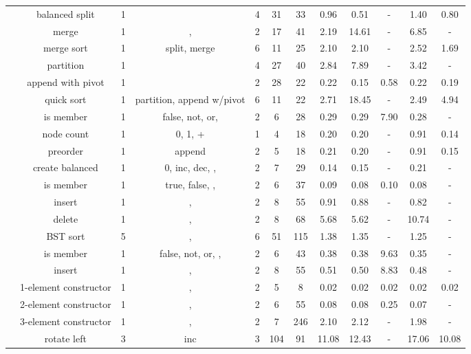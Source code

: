 \documentclass[10pt,preprint]{sigplanconf-pldi16}
\theoremstyle{definition}
\begin{document}
\begin{table*}[!htbp]
\begin{center}
{\begin{tabular}{@{} r|c| cccc | cccccc @{}}
 & balanced split & 1 &  & 4 & 31 & 33 & 0.96 & 0.51 & - & 1.40 & 0.80 \\
 & merge & 1 & ,  & 2 & 17 & 41 & 2.19 & 14.61 & - & 6.85 & - \\
 & merge sort & 1 & split, merge & 6 & 11 & 25 & 2.10 & 2.10 & - & 2.52 & 1.69 \\
 & partition & 1 &  & 4 & 27 & 40 & 2.84 & 7.89 & - & 3.42 & - \\
 & append with pivot & 1 &  & 2 & 28 & 22 & 0.22 & 0.15 & 0.58 & 0.22 & 0.19 \\
 & quick sort & 1 & partition, append w/pivot & 6 & 11 & 22 & 2.71 & 18.45 & - & 2.49 & 4.94 \\
\hline\multirow{4}{*}{\parbox{1cm}{\vspace{-0.85\baselineskip}}} & is member & 1 & false, not, or,  & 2 & 6 & 28 & 0.29 & 0.29 & 7.90 & 0.28 & - \\
 & node count & 1 & 0, 1, + & 1 & 4 & 18 & 0.20 & 0.20 & - & 0.91 & 0.14 \\
 & preorder & 1 & append & 2 & 5 & 18 & 0.21 & 0.20 & - & 0.91 & 0.15 \\
 & create balanced & 1 & 0, inc, dec, ,  & 2 & 7 & 29 & 0.14 & 0.15 & - & 0.21 & - \\
\hline\multirow{4}{*}{\parbox{1cm}{\vspace{-0.85\baselineskip}}} & is member & 1 & true, false, ,  & 2 & 6 & 37 & 0.09 & 0.08 & 0.10 & 0.08 & - \\
 & insert & 1 & ,  & 2 & 8 & 55 & 0.91 & 0.88 & - & 0.82 & - \\
 & delete & 1 & ,  & 2 & 8 & 68 & 5.68 & 5.62 & - & 10.74 & - \\
 & BST sort & 5 & ,  & 6 & 51 & 115 & 1.38 & 1.35 & - & 1.25 & - \\
\hline\multirow{5}{*}{\parbox{1cm}{\vspace{-0.85\baselineskip}}} & is member & 1 & false, not, or, ,  & 2 & 6 & 43 & 0.38 & 0.38 & 9.63 & 0.35 & - \\
 & insert & 1 & ,  & 2 & 8 & 55 & 0.51 & 0.50 & 8.83 & 0.48 & - \\
 & 1-element constructor & 1 & ,  & 2 & 5 & 8 & 0.02 & 0.02 & 0.02 & 0.02 & 0.02 \\
 & 2-element constructor & 1 & ,  & 2 & 6 & 55 & 0.08 & 0.08 & 0.25 & 0.07 & - \\
 & 3-element constructor & 1 & ,  & 2 & 7 & 246 & 2.10 & 2.12 & - & 1.98 & - \\
\hline\multirow{6}{*}{\parbox{1cm}{\vspace{-0.85\baselineskip}}} & rotate left & 3 & inc & 3 & 104 & 91 & 11.08 & 12.43 & - & 17.06 & 10.08 \\

\end{tabular}}
\end{center}
\end{table*}
\end{document}
